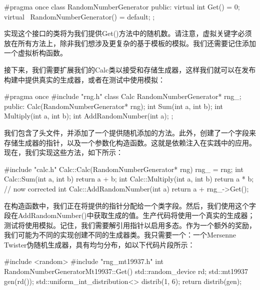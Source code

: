 
\begin{cmake}
#pragma once
class RandomNumberGenerator {
    public:
    virtual int Get() = 0;
    virtual ~RandomNumberGenerator() = default;
};
\end{cmake}

实现这个接口的类将为我们提供Get()方法中的随机数。请注意，虚拟关键字必须放在所有方法上，除非我们想涉及更复杂的基于模板的模拟。我们还需要记住添加一个虚拟析构函数。

接下来，我们需要扩展我们的Calc类以接受和存储生成器，这样我们就可以在发布构建中提供真实的生成器，或者在测试中使用模拟：


\begin{cmake}
#pragma once
#include "rng.h"
class Calc {
    RandomNumberGenerator* rng_;
public:
    Calc(RandomNumberGenerator* rng);
    int Sum(int a, int b);
    int Multiply(int a, int b);
    int AddRandomNumber(int a);
};
\end{cmake}

我们包含了头文件，并添加了一个提供随机添加的方法。此外，创建了一个字段来存储生成器的指针，以及一个参数化构造函数。这就是依赖注入在实践中的应用。现在，我们实现这些方法，如下所示：


\begin{cpp}
#include "calc.h"
Calc::Calc(RandomNumberGenerator* rng) {
    rng_ = rng;
}
int Calc::Sum(int a, int b) {
    return a + b;
}
int Calc::Multiply(int a, int b) {
    return a * b; // now corrected
}
int Calc::AddRandomNumber(int a) {
    return a + rng_->Get();
}
\end{cpp}

在构造函数中，我们正在将提供的指针分配给一个类字段。然后，我们使用这个字段在AddRandomNumber()中获取生成的值。生产代码将使用一个真实的生成器；测试将使用模拟。记住，我们需要解引用指针以启用多态。作为一个额外的奖励，我们可能为不同的实现创建不同的生成器类。我只需要一个：一个Mersenne Twister伪随机生成器，具有均匀分布，如以下代码片段所示：


\begin{cpp}
#include <random>
#include "rng_mt19937.h"
int RandomNumberGeneratorMt19937::Get() {
    std::random_device rd;
    std::mt19937 gen(rd());
    std::uniform_int_distribution<> distrib(1, 6);
    return distrib(gen);
}
\end{cpp}

